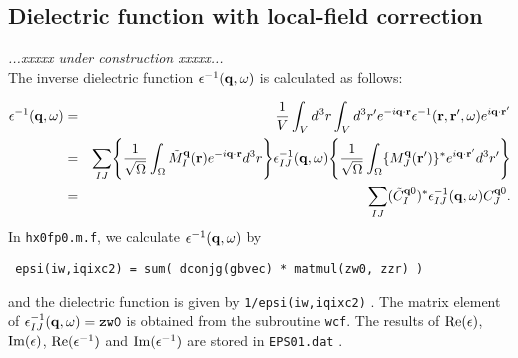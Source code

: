 \documentclass[a4paper,10pt,epsf,fleqn]{article}
\def\underconstruction{{\it...xxxxx under construction xxxxx...\\}}
\begin{document}
\subsection{Dielectric function with local-field correction}
\underconstruction
The inverse dielectric function $\epsilon^{-1}({\bf q},\omega)$ 
is calculated as follows:

\begin{eqnarray}
  \epsilon^{-1}({\bf q},\omega) 
 &=& \frac{1}{V}
  \int_V d^3r \int_V d^3r' e^{-i{\bf q}\cdot{\bf r}}
  \epsilon^{-1}({\bf r},{\bf r}',\omega)e^{i{\bf q}\cdot{\bf r}'} \nonumber \\
 &=&
  \sum_{IJ}
  \Biggr\{ \frac{1}{\sqrt{\Omega}} \int_{\Omega}  
  \tilde{M}_I^{\bf q}({\bf r})e^{-i{\bf q}\cdot{\bf r}}d^3r \Biggr\} 
  \epsilon_{IJ}^{-1}({\bf q}, \omega) 
  \Biggr\{ \frac{1}{\sqrt{\Omega}} \int_{\Omega}  
  \{ M_J^{\bf q}({\bf r}') \}^* e^{i{\bf q}\cdot{\bf r}'} d^3r' \Biggr\} 
  \nonumber \\
 &=& 
   \sum_{IJ} ( \tilde{C}^{{\bf q}0}_I )^* 
   \epsilon_{IJ}^{-1}({\bf q},\omega) C^{{\bf q}0}_J.
           \label{eq. epsi}
\end{eqnarray}
In \verb|hx0fp0.m.f|, we calculate $\epsilon^{-1}({\bf q},\omega)$ by
\begin{center}
 \verb| epsi(iw,iqixc2) = sum( dconjg(gbvec) * matmul(zw0, zzr) ) |
\end{center}
and the dielectric function is given by \verb|1/epsi(iw,iqixc2)| .
The matrix element of $\epsilon^{-1}_{IJ}({\bf q},\omega)=\verb|zw0|$
is obtained from the subroutine \verb|wcf|.
The results of ${\rm Re}(\epsilon)$, ${\rm Im}(\epsilon)$, 
${\rm Re}(\epsilon^{-1})$
and ${\rm Im}(\epsilon^{-1})$ are stored in \verb|EPS01.dat| .

\newpage
\end{document}
